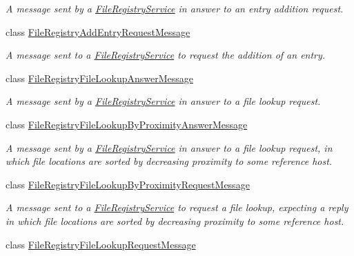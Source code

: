 \begin{DoxyCompactItemize}
\begin{DoxyCompactList}\small\item\em A message sent by a \hyperlink{classwrench_1_1_file_registry_service}{File\+Registry\+Service} in answer to an entry addition request. \end{DoxyCompactList}\item 
class \hyperlink{classwrench_1_1_file_registry_add_entry_request_message}{File\+Registry\+Add\+Entry\+Request\+Message}
\begin{DoxyCompactList}\small\item\em A message sent to a \hyperlink{classwrench_1_1_file_registry_service}{File\+Registry\+Service} to request the addition of an entry. \end{DoxyCompactList}\item 
class \hyperlink{classwrench_1_1_file_registry_file_lookup_answer_message}{File\+Registry\+File\+Lookup\+Answer\+Message}
\begin{DoxyCompactList}\small\item\em A message sent by a \hyperlink{classwrench_1_1_file_registry_service}{File\+Registry\+Service} in answer to a file lookup request. \end{DoxyCompactList}\item 
class \hyperlink{classwrench_1_1_file_registry_file_lookup_by_proximity_answer_message}{File\+Registry\+File\+Lookup\+By\+Proximity\+Answer\+Message}
\begin{DoxyCompactList}\small\item\em A message sent by a \hyperlink{classwrench_1_1_file_registry_service}{File\+Registry\+Service} in answer to a file lookup request, in which file locations are sorted by decreasing proximity to some reference host. \end{DoxyCompactList}\item 
class \hyperlink{classwrench_1_1_file_registry_file_lookup_by_proximity_request_message}{File\+Registry\+File\+Lookup\+By\+Proximity\+Request\+Message}
\begin{DoxyCompactList}\small\item\em A message sent to a \hyperlink{classwrench_1_1_file_registry_service}{File\+Registry\+Service} to request a file lookup, expecting a reply in which file locations are sorted by decreasing proximity to some reference host. \end{DoxyCompactList}\item 
class \hyperlink{classwrench_1_1_file_registry_file_lookup_request_message}{File\+Registry\+File\+Lookup\+Request\+Message}

\end{DoxyCompactItemize}
